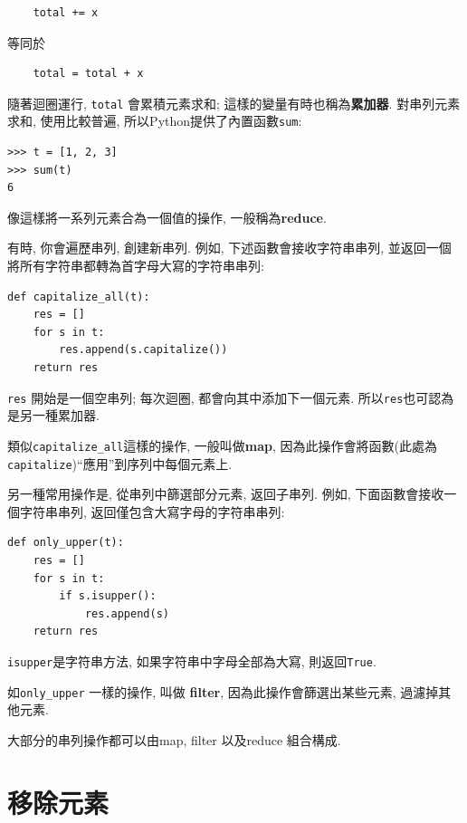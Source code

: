\documentclass[10pt]{book}
\begin{document}
\begin{verbatim}
    total += x
\end{verbatim}
%
等同於

\begin{verbatim}
    total = total + x
\end{verbatim}
%
隨著迴圈運行, {\tt total} 會累積元素求和;
這樣的變量有時也稱為{\bf 累加器}. 
對串列元素求和, 使用比較普遍, 所以Python提供了內置函數{\tt sum}:

\begin{verbatim}
>>> t = [1, 2, 3]
>>> sum(t)
6
\end{verbatim}
%
像這樣將一系列元素合為一個值的操作, 一般稱為{\bf reduce}.

有時, 你會遍歷串列, 創建新串列. 例如, 下述函數會接收字符串串列, 
並返回一個將所有字符串都轉為首字母大寫的字符串串列:

\begin{verbatim}
def capitalize_all(t):
    res = []
    for s in t:
        res.append(s.capitalize())
    return res
\end{verbatim}
%
{\tt res} 開始是一個空串列; 每次迴圈, 都會向其中添加下一個元素. 
所以{\tt res}也可認為是另一種累加器. 

類似\verb"capitalize_all"這樣的操作, 一般叫做{\bf map}, 
因為此操作會將函數(此處為{\tt capitalize})``應用''到序列中每個元素上. 

另一種常用操作是, 從串列中篩選部分元素, 返回子串列. 例如, 
下面函數會接收一個字符串串列, 返回僅包含大寫字母的字符串串列:

\begin{verbatim}
def only_upper(t):
    res = []
    for s in t:
        if s.isupper():
            res.append(s)
    return res
\end{verbatim}
%
{\tt isupper}是字符串方法, 如果字符串中字母全部為大寫, 則返回{\tt True}. 

如\verb"only_upper" 一樣的操作, 叫做 {\bf filter}, 因為此操作會篩選出某些元素, 
過濾掉其他元素. 

大部分的串列操作都可以由map, filter 以及reduce 組合構成. 


\section{移除元素}
\end{document}
